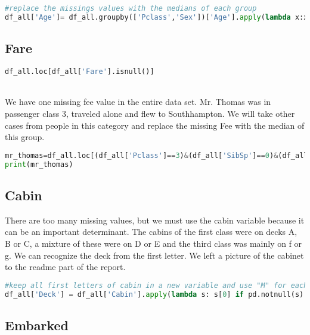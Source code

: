 \documentclass[onecolumn]{article}
\begin{document}
\begin{lstlisting}[language=Python, caption=  age ] 
#replace the missings values with the medians of each group
df_all['Age']= df_all.groupby(['Pclass','Sex'])['Age'].apply(lambda x:x.fillna(x.median()))
\end{lstlisting}

\subsection{Fare}
\begin{lstlisting}[language=Python, caption=  fare ] 
df_all.loc[df_all['Fare'].isnull()]   
\end{lstlisting}
\\

We have one missing fee value in the entire data set. Mr. Thomas was in passenger class 3, traveled alone and flew to Southhampton. We will take other cases from people in this category and replace the missing Fee with the median of this group.

\begin{lstlisting}[language=Python, caption=  loc cases which are similar to Mr.Thomas and use the median of fare to replace  the missing for his data set ] 
mr_thomas=df_all.loc[(df_all['Pclass']==3)&(df_all['SibSp']==0)&(df_all['Embarked']=='S')]['Fare'].median()
print(mr_thomas)
\end{lstlisting}
\subsection{Cabin}

There are too many missing values, but we must use the cabin variable because it can be an important determinant. The cabins of the first class were on decks A, B or C, a mixture of these were on D or E and the third class was mainly on f or g. We can recognize the deck from the first letter.
We left a picture of the cabinet to the readme part of the report.

\begin{lstlisting}[language=Python, caption=  cabin missing values] 
#keep all first letters of cabin in a new variable and use "M" for each missing
df_all['Deck'] = df_all['Cabin'].apply(lambda s: s[0] if pd.notnull(s) else 'M' )
\end{lstlisting}
\subsection{Embarked}
\end{document}

